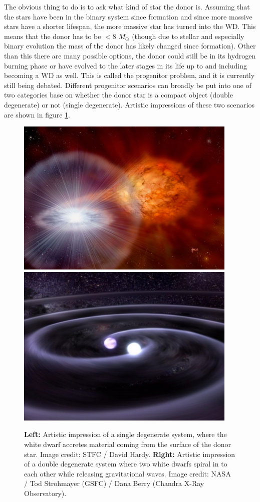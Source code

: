 \documentclass[a4paper,oneside,12pt, class=Latex/Classes/PhDthesisPSnPDF, crop=false]{standalone}
\begin{document}
The obvious thing to do is to ask what kind of star the donor is. Assuming that the stars have been in the binary system since formation and since more massive stars have a shorter lifespan, the more massive star has turned into the WD. This means that the donor has to be $<8$ $M_\odot$ (though due to stellar and especially binary evolution the mass of the donor has likely changed since formation). Other than this there are many possible options, the donor could still be in its hydrogen burning phase or have evolved to the later stages in its life up to and including becoming a WD as well. This is called the progenitor problem, and it is currently still being debated. Different progenitor scenarios can broadly be put into one of two categories base on whether the donor star is a compact object (double degenerate) or not (single degenerate). Artistic impressions of these two scenarios are shown in figure \ref{single_double_deg_mods}.

\begin{figure}
    \centering
    \includegraphics[height=0.229\textheight]{../Images/chapter_1/single_deg.jpeg}
    \includegraphics[height=0.229\textheight]{../Images/chapter_1/double_deg.jpeg}
    \caption{\textbf{Left:} Artistic impression of a single degenerate system, where the white dwarf accretes material coming from the surface of the donor star. Image credit: STFC / David Hardy. \textbf{Right:} Artistic impression of a double degenerate system where two white dwarfs spiral in to each other while releasing gravitational waves. Image credit: NASA / Tod Strohmayer (GSFC) / Dana Berry (Chandra X-Ray Observatory).}
    \label{single_double_deg_mods}
\end{figure}
\end{document}

